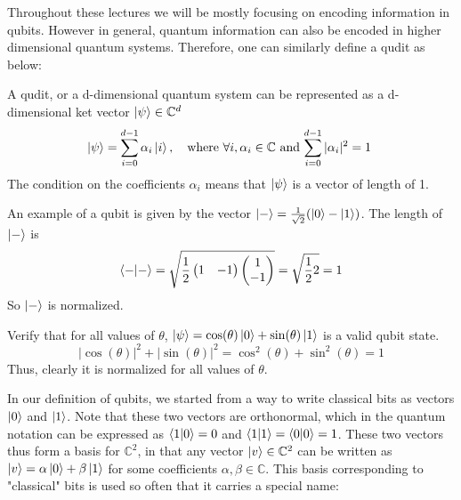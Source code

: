 Throughout these lectures we will be mostly focusing on encoding information in qubits. However in general, quantum information can also be encoded in higher dimensional quantum systems. Therefore, one can similarly define a qudit as below:
\begin{definition}
    A qudit, or a d-dimensional quantum system can be represented as a d-dimensional ket vector $\ket{\psi} \in \mathbb{C}^d$
    \[
    \ket{\psi}=\sum_{i=0}^{d-1} \alpha_i\ket{i}, \quad \text{where $\forall i, \alpha_i \in \mathbb{C}$ and $\sum_{i=0}^{d-1} |\alpha_i|^2=1$ }
    \]
    The condition on the coefficients $\alpha_i$ means that $\ket{\psi}$ is a vector of length of 1.
\end{definition}
\begin{example}
    An example of a qubit is given by the vector $\ket{-}=\frac{1}{\sqrt{2}}(\ket{0}-\ket{1})$. The length of $\ket{-}$ is
    \[
    \braket{-|-}=\sqrt{\frac{1}{2}\begin{pmatrix} 1 & -1 \end{pmatrix} \begin{pmatrix} 1 \\ -1 \end{pmatrix}}=\sqrt{\frac{1}{2}2}=1
    \]
    So $\ket{-}$ is normalized.
\end{example}
\begin{example}
    Verify that for all values of $\theta$, $\ket{\psi}=\cos (\theta) \ket{0} + \sin (\theta) \ket{1}$ is a valid qubit state.
    \[
    |\cos (\theta)|^2+|\sin (\theta)|^2=\cos^2 (\theta) + \sin^2 (\theta)=1
    \]
    Thus, clearly it is normalized for all values of $\theta$.
\end{example}
In our definition of qubits, we started from a way to write classical bits as vectors $\ket{0}$ and $\ket{1}$. Note that these two vectors are orthonormal, which in the quantum notation can be expressed as $\braket{1|0}=0$ and $\braket{1|1}=\braket{0|0}=1$. These two vectors thus form a basis for $\mathbb{C}^2$, in that any vector $\ket{v}\in \mathbb{C}^2$ can be written as $\ket{v}=\alpha \ket{0} +\beta \ket{1}$ for some coefficients $\alpha,\beta \in \mathbb{C}$. This basis corresponding to "classical" bits is used so often that it carries a special name:

